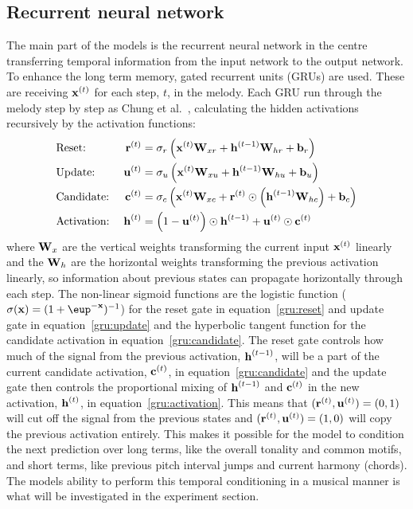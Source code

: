 \subsection{Recurrent neural network} %
\label{sub:recurrent_neural_network}
	The main part of the models is the recurrent neural network in the centre transferring temporal information from the input network to the output network.
	To enhance the long term memory, gated recurrent units (GRUs) are used. These are receiving $\bm{\mathrm{x}}^{(t)}$ for each step, $t$, in the melody. Each GRU run through the melody step by step as Chung et al.\ \cite{Chung2014}, calculating the hidden activations recursively by the activation functions:
	\begin{alignat}{2}
	 	& \text{Reset:} \; & \bm{\mathrm{r}}^{(t)} &= \sigma_r\left(\bm{\mathrm{x}}^{(t)} \bm{\mathrm{W}}_{xr} + \bm{\mathrm{h}}^{(t-1)} \bm{\mathrm{W}}_{hr} + \bm{\mathrm{b}}_r\right) \label{gru:reset} \\
        & \text{Update:} \; & \bm{\mathrm{u}}^{(t)} &= \sigma_u\left(\bm{\mathrm{x}}^{(t)} \bm{\mathrm{W}}_{xu} + \bm{\mathrm{h}}^{(t-1)} \bm{\mathrm{W}}_{hu} + \bm{\mathrm{b}}_u\right) \label{gru:update} \\
        & \text{Candidate:} \; & \bm{\mathrm{c}}^{(t)} &= \sigma_c\left(\bm{\mathrm{x}}^{(t)} \bm{\mathrm{W}}_{xc} + \bm{\mathrm{r}}^{(t)} \odot \left(\bm{\mathrm{h}}^{(t-1)} \bm{\mathrm{W}}_{hc}\right) + \bm{\mathrm{b}}_c\right) \label{gru:candidate} \\
        & \text{Activation:} \; & \bm{\mathrm{h}}^{(t)} &= \left(1 - \bm{\mathrm{u}}^{(t)}\right) \odot \bm{\mathrm{h}}^{(t-1)} + \bm{\mathrm{u}}^{(t)} \odot \bm{\mathrm{c}}^{(t)} \label{gru:activation}
	\end{alignat}
	where $\bm{\mathrm{W}}_x$ are the vertical weights transforming the current input $\bm{\mathrm{x}}^{(t)}$ linearly and the $\bm{\mathrm{W}}_h$ are the horizontal weights transforming the previous activation linearly, so information about previous states can propagate horizontally through each step. The non-linear sigmoid functions are the logistic function ($\sigma(\vec{x})=(1+\eup^{-\vec{x}})^{-1}$) for the reset gate in equation~\eqref{gru:reset} and update gate in equation~\eqref{gru:update} and the hyperbolic tangent function for the candidate activation in equation~\eqref{gru:candidate}. The reset gate controls how much of the signal from the previous activation, $\bm{\mathrm{h}}^{(t-1)}$, will be a part of the current candidate activation, $\bm{\mathrm{c}}^{(t)}$, in equation~\eqref{gru:candidate} and the update gate then controls the proportional mixing of $\bm{\mathrm{h}}^{(t-1)}$ and $\bm{\mathrm{c}}^{(t)}$ in the new activation, $\bm{\mathrm{h}}^{(t)}$, in equation~\eqref{gru:activation}. This means that $(\bm{\mathrm{r}}^{(t)}, \bm{\mathrm{u}}^{(t)}) = (0,1)$ will cut off the signal from the previous states and $(\bm{\mathrm{r}}^{(t)}, \bm{\mathrm{u}}^{(t)}) = (1,0)$ will copy the previous activation entirely. This makes it possible for the model to condition the next prediction over long terms, like the overall tonality and common motifs, and short terms, like previous pitch interval jumps and current harmony (chords). The models ability to perform this temporal conditioning in a musical manner is what will be investigated in the experiment section. 


